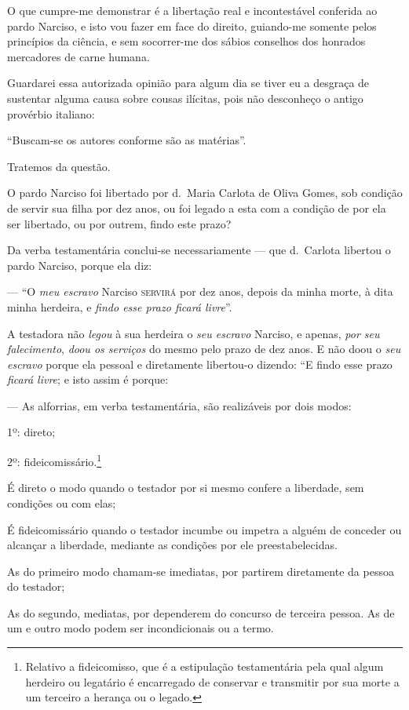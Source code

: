 O que cumpre-me demonstrar é a libertação real e incontestável conferida
ao pardo Narciso, e isto vou fazer em face do direito, guiando-me
somente pelos princípios da ciência, e sem socorrer-me dos sábios
conselhos dos honrados mercadores de carne humana.

Guardarei essa autorizada opinião para algum dia se tiver eu a desgraça
de sustentar alguma causa sobre cousas ilícitas, pois não desconheço o
antigo provérbio italiano:

``Buscam-se os autores conforme são as matérias''.

Tratemos da questão.

O pardo Narciso foi libertado por d.~Maria Carlota de Oliva Gomes, sob
condição de servir sua filha por dez anos, ou foi legado a esta com a
condição de por ela ser libertado, ou por outrem, findo este prazo?

Da verba testamentária conclui-se necessariamente --- que d.~Carlota
libertou o pardo Narciso, porque ela diz:

--- ``O \emph{meu escravo} Narciso \textsc{servirá} por dez anos, depois da minha
morte, à dita minha herdeira, e \emph{findo esse prazo ficará livre}''.

A testadora não \emph{legou} à sua herdeira o \emph{seu escravo}
Narciso, e apenas, \emph{por seu falecimento}, \emph{doou os serviços}
do mesmo pelo prazo de dez anos. E não doou o \emph{seu escravo} porque
ela pessoal e diretamente libertou-o dizendo: ``E findo esse prazo
\emph{ficará livre}; e isto assim é porque:

--- As alforrias, em verba testamentária, são realizáveis por dois
modos:

1º: direto;

2º: fideicomissário.\footnote{ Relativo a
  fideicomisso, que é a estipulação testamentária pela qual algum
  herdeiro ou legatário é encarregado de conservar e transmitir por sua
  morte a um terceiro a herança ou o legado.}

É direto o modo quando o testador por si mesmo confere a liberdade, sem
condições ou com elas;

É fideicomissário quando o testador incumbe ou impetra a alguém de
conceder ou alcançar a liberdade, mediante as condições por ele
preestabelecidas.

As do primeiro modo chamam-se imediatas, por partirem diretamente da
pessoa do testador;

As do segundo, mediatas, por dependerem do concurso de terceira pessoa.
As de um e outro modo podem ser incondicionais ou a termo.

